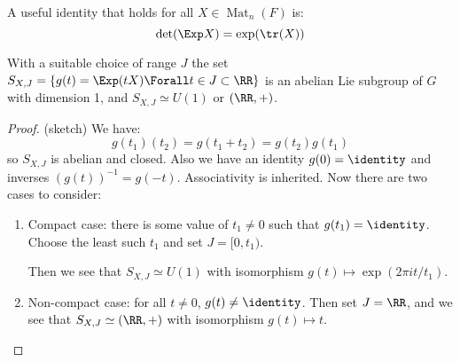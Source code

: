 \documentclass{jknotes}
\begin{document}
A useful identity that holds for all \(X \in \operatorname{Mat}_n(F)\) is:
\begin{equation}
    \det(\Exp X) = \exp(\tr(X))
\end{equation}

\begin{lemma}
    With a suitable choice of range \(J\) the set \(S_{X,J} = \{g(t) = \Exp(tX) \Forall t \in J \subset \RR\}\) is an abelian Lie subgroup of \(G\) with dimension 1, and \(S_{X,J}\simeq U(1)\) or \((\RR,+)\).
\end{lemma}
\begin{proof} (sketch)
    We have:
    \begin{equation}
        g(t_1)(t_2) = g(t_1+t_2) = g(t_2)g(t_1)
    \end{equation}
    so \(S_{X,J}\) is abelian and closed. Also we have an identity \(g(0) = \identity\) and inverses \((g(t))^{-1} = g(-t)\). Associativity is inherited.
    Now there are two cases to consider:
    \begin{enumerate}
        \item Compact case: there is some value of \(t_1 \ne 0\) such that \(g(t_1) = \identity\). Choose the least such \(t_1\) and set \(J = [0,t_1)\). 
                \begin{figure}[H]
                    \centering
                \end{figure}
                Then we see that \(S_{X,J} \simeq U(1)\) with isomorphism \(g(t) \mapsto \exp(2\pi i t/t_1)\).
        \item Non-compact case: for all \(t \ne 0\), \(g(t) \ne \identity\). Then set \(J = \RR\), and we see that \(S_{X,J} \simeq (\RR,+)\) with isomorphism \(g(t) \mapsto t\).
                \begin{figure}[H]
                    \centering
                    \begin{tikzpicture}[yscale=0.6]

\end{tikzpicture}
\end{figure}
\end{enumerate}
\end{proof}
\end{document}
